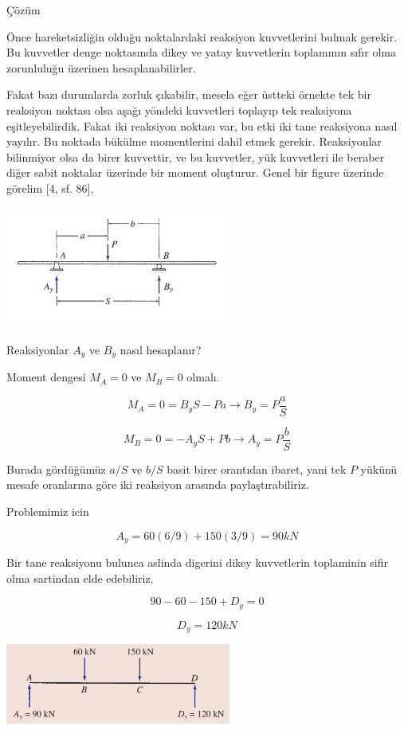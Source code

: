 \documentclass[12pt,fleqn]{article}\usepackage{../../common}
\begin{document}
Çözüm

Önce hareketsizliğin olduğu noktalardaki reaksiyon kuvvetlerini bulmak gerekir.
Bu kuvvetler denge noktasında dikey ve yatay kuvvetlerin toplamının sıfır olma
zorunluluğu üzerinen hesaplanabilirler.

Fakat bazı durumlarda zorluk çıkabilir, mesela eğer üstteki örnekte tek bir
reaksiyon noktası olsa aşağı yöndeki kuvvetleri toplayıp tek reaksiyona
eşitleyebilirdik. Fakat iki reaksiyon noktası var, bu etki iki tane reaksiyona
nasıl yayılır. Bu noktada bükülme momentlerini dahil etmek gerekir. Reaksiyonlar
bilinmiyor olsa da birer kuvvettir, ve bu kuvvetler, yük kuvvetleri ile beraber
diğer sabit noktalar üzerinde bir moment oluşturur. Genel bir figure üzerinde
görelim [4, sf. 86],

\includegraphics[width=20em]{phy_020_strs_02_14.jpg}

Reaksiyonlar $A_y$ ve $B_y$ nasıl hesaplanır?

Moment dengesi $M_A = 0$ ve $M_B = 0$ olmalı.

$$
M_A = 0 = B_y S - P a \to B_y = P \frac{a}{S}
$$

$$
M_B = 0 = -A_y S + P b \to A_y = P \frac{b}{S}
$$

Burada gördüğümüz $a/S$ ve $b/S$ basit birer orantıdan ibaret, yani tek $P$
yükünü mesafe oranlarına göre iki reaksiyon arasında paylaştırabiliriz.

Problemimiz icin

$$
A_y = 60 (6/9) + 150 (3/9) = 90 kN
$$

Bir tane reaksiyonu bulunca aslinda digerini dikey kuvvetlerin toplaminin sifir
olma sartindan elde edebiliriz,

$$
90 - 60 - 150 + D_y = 0 
$$

$$
D_y = 120 kN
$$

\includegraphics[width=20em]{phy_020_strs_02_15.jpg}
\end{document}
